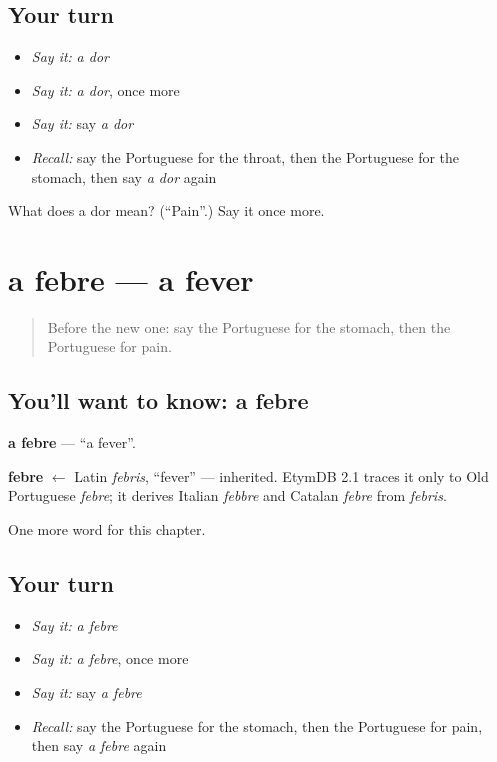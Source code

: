 \subsection*{Your turn}
\begin{itemize}
\raggedright
  \item \emph{Say it:} \emph{a dor}
  \item \emph{Say it:} \emph{a dor}, once more
  \item \emph{Say it:} say \emph{a dor}
  \item \emph{Recall:} say the Portuguese for the throat, then the Portuguese for the stomach, then say \emph{a dor} again
\end{itemize}

\begin{tcolorbox}[breakable,colback=teal!4,colframe=teal!35!black,title={Before you move on}]
What does a dor mean? (\textquotedblleft{}Pain\textquotedblright{}.) Say it once more.
\end{tcolorbox}
\section[a febre]{a febre — a fever}

\label{lesson:PT-C34-febre}



\begin{quote}
Before the new one: say the Portuguese for the stomach, then the Portuguese for pain.
\end{quote}

\subsection*{You'll want to know: a febre}
\textbf{a febre} — \textquotedblleft{}a fever\textquotedblright{}.

\begin{cousinweb}
\textbf{febre} $\leftarrow$ Latin \emph{febris}, \textquotedblleft{}fever\textquotedblright{} — inherited. EtymDB 2.1 traces it only to Old Portuguese \emph{febre}; it derives Italian \emph{febbre} and Catalan \emph{febre} from \emph{febris}.
\end{cousinweb}

\begin{grammarlens}[title={What you've built}]
One more word for this chapter.
\end{grammarlens}

\subsection*{Your turn}
\begin{itemize}
\raggedright
  \item \emph{Say it:} \emph{a febre}
  \item \emph{Say it:} \emph{a febre}, once more
  \item \emph{Say it:} say \emph{a febre}
  \item \emph{Recall:} say the Portuguese for the stomach, then the Portuguese for pain, then say \emph{a febre} again
\end{itemize}

